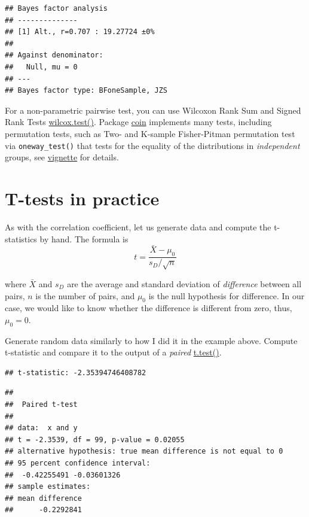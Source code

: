 \documentclass[
]{book}
\begin{document}
\begin{verbatim}
## Bayes factor analysis
## --------------
## [1] Alt., r=0.707 : 19.27724 ±0%
## 
## Against denominator:
##   Null, mu = 0 
## ---
## Bayes factor type: BFoneSample, JZS
\end{verbatim}

For a non-parametric pairwise test, you can use Wilcoxon Rank Sum and Signed Rank Tests \href{https://stat.ethz.ch/R-manual/R-devel/library/stats/html/wilcox.test.html}{wilcox.test()}. Package \href{http://coin.r-forge.r-project.org/}{coin} implements many tests, including permutation tests, such as Two- and K-sample Fisher-Pitman permutation test via \texttt{oneway\_test()} that tests for the equality of the distributions in \emph{independent} groups, see \href{https://cran.r-project.org/web/packages/coin/vignettes/coin.pdf}{vignette} for details.

\hypertarget{t-tests-in-practice}{%
\section{T-tests in practice}\label{t-tests-in-practice}}

As with the correlation coefficient, let us generate data and compute the t-statistics by hand. The formula is
\[t = \frac{\bar{X} - \mu_0}{s_D / \sqrt{n}}\]

where \(\bar{X}\) and \(s_D\) are the average and standard deviation of \emph{difference} between all pairs, \(n\) is the number of pairs, and \(\mu_0\) is the null hypothesis for difference. In our case, we would like to know whether the difference is different from zero, thus, \(\mu_0 = 0\).

Generate random data similarly to how I did it in the example above. Compute t-statistic and compare it to the output of a \emph{paired} \href{https://stat.ethz.ch/R-manual/R-devel/library/stats/html/t.test.html}{t.test()}.

\begin{verbatim}
## t-statistic: -2.35394746408782
\end{verbatim}

\begin{verbatim}
## 
##  Paired t-test
## 
## data:  x and y
## t = -2.3539, df = 99, p-value = 0.02055
## alternative hypothesis: true mean difference is not equal to 0
## 95 percent confidence interval:
##  -0.42255491 -0.03601326
## sample estimates:
## mean difference 
##      -0.2292841
\end{verbatim}
\end{document}
